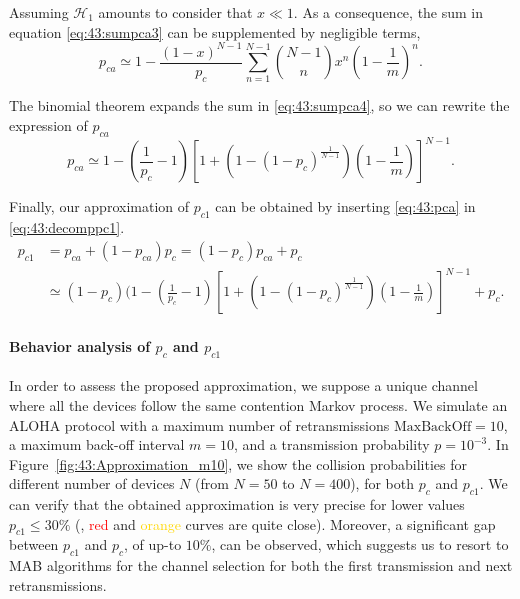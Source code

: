 Assuming $\mathcal{H}_{1}$ amounts to consider that $x\ll 1$. As a consequence, the sum in equation \eqref{eq:43:sumpca3} can be supplemented by negligible terms,
%
\begin{equation}\label{eq:43:sumpca4}
	p_{ca} \simeq  1 - \frac{\left(1-x\right)^{N-1}}{p_c}\sum_{n=1}^{N-1}{N-1 \choose n} x^n \left( 1-\frac{1}{m}\right)^n.
\end{equation}

The binomial theorem expands the sum in \eqref{eq:43:sumpca4}, so we can rewrite the expression of $p_{ca}$
%
\begin{equation}\label{eq:43:pca}
	p_{ca} \simeq 1 - \left(\frac{1}{p_c}-1\right)\left[ 1+\left(1-\left(1-p_c\right)^{\frac{1}{N-1}}\right)\left(1-\frac{1}{m}\right)\right]^{N-1}.
\end{equation}

Finally, our approximation of $p_{c1}$ can be obtained by inserting \eqref{eq:43:pca} in \eqref{eq:43:decomppc1}.
%
\begin{align}\label{eq:43:final_expression_pc1}
	p_{c1} &= p_{ca}+\left(1-p_{ca}\right)p_c = (1 - p_c) p_{ca} + p_c \nonumber \\
	&\simeq \left(1 - p_c\right) (1 - \left(\frac{1}{p_c}-1\right)\left[ 1+\left(1-\left(1-p_c\right)^{\frac{1}{N-1}}\right)\left(1-\frac{1}{m}\right)\right]^{N-1} + p_c.
\end{align}


\paragraph{Behavior analysis of $p_{c}$ and $p_{c1}$}\label{sub:43:numericalValidationPC1PC}

In order to assess the proposed approximation, we suppose a unique channel where all the devices follow the same contention Markov process.
We simulate an ALOHA protocol with a maximum number of retransmissions $\mathrm{MaxBackOff}=10$, a maximum back-off interval $m=10$, and a transmission probability $p=10^{-3}$.
%
In Figure~\ref{fig:43:Approximation_m10}, we show the collision probabilities for different number of devices $N$ (from $N=50$ to $N=400$), for both $p_{c}$ and $p_{c1}$.
%
We can verify that the obtained approximation is very precise for lower values $p_{c1} \leq 30 \%$ (\ie, \textcolor{red}{red} and \textcolor{gold}{orange} curves are quite close).
Moreover, a significant gap between $p_{c1}$ and $p_c$,
of up-to $10\%$, can be observed,
which suggests us to resort to MAB algorithms for the channel selection for both the first transmission and next retransmissions.

